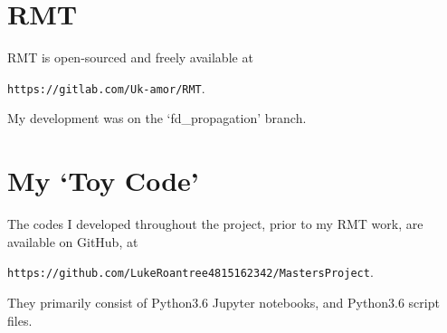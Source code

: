 
\section{RMT}
RMT is open-sourced and freely available at 

\texttt{https://gitlab.com/Uk-amor/RMT}.


My development was on the `fd\_propagation' branch.

\section{My `Toy Code'}
The codes I developed throughout the project, prior to my RMT work, are available on GitHub, at 

\texttt{https://github.com/LukeRoantree4815162342/MastersProject}.


They primarily consist of Python3.6 Jupyter notebooks, and Python3.6 script files.


